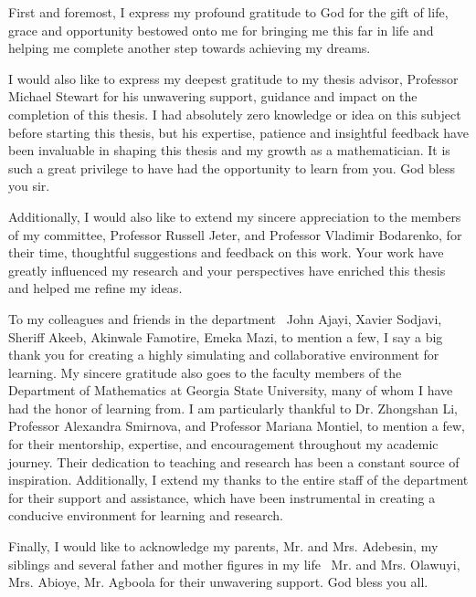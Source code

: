 First and foremost, I express my profound gratitude to God for the gift of life, grace and opportunity bestowed onto me for bringing me this far in life and helping me complete another step towards achieving my dreams.

I would also like to express my deepest gratitude to my thesis advisor, Professor Michael Stewart for his unwavering support, guidance and impact on the completion of this thesis. I had absolutely zero knowledge or idea on this subject before starting this thesis, but his expertise, patience and insightful feedback have been invaluable in shaping this thesis and my growth as a mathematician. It is such a great privilege to have had the opportunity to learn from you. God bless you sir.

Additionally, I would also like to extend my sincere appreciation to the members of my committee, Professor Russell Jeter, and Professor Vladimir Bodarenko, for their time, thoughtful suggestions and feedback on this work. Your work have greatly influenced my research and your perspectives have enriched this thesis and helped me refine my ideas.

To my colleagues and friends in the department \textemdash\, John Ajayi, Xavier Sodjavi, Sheriff Akeeb, Akinwale Famotire, Emeka Mazi, to mention a few, I say a big thank you for creating a highly simulating and collaborative environment for learning. My sincere gratitude also goes to the faculty members of the Department of Mathematics at Georgia State University, many of whom I have had the honor of learning from. I am particularly thankful to Dr. Zhongshan Li, Professor Alexandra Smirnova, and Professor Mariana Montiel, to mention a few, for their mentorship, expertise, and encouragement throughout my academic journey. Their dedication to teaching and research has been a constant source of inspiration. Additionally, I extend my thanks to the entire staff of the department for their support and assistance, which have been instrumental in creating a conducive environment for learning and research.

Finally, I would like to acknowledge my parents, Mr. and Mrs. Adebesin, my siblings and several father and mother figures in my life \textemdash\, Mr. and Mrs. Olawuyi, Mrs. Abioye, Mr. Agboola for their unwavering support. God bless you all.
